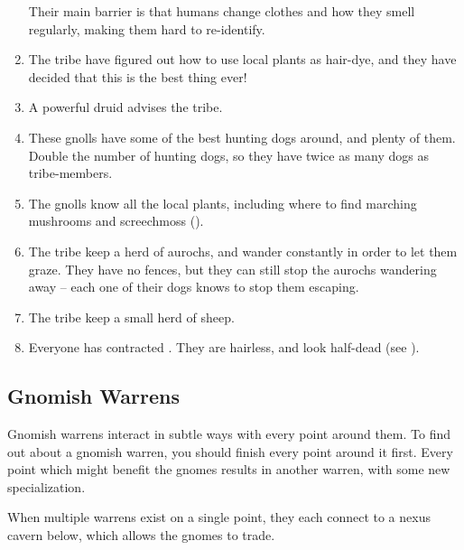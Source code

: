 \begin{multicols}{2}
\begin{enumerate}
  Their main barrier is that humans change clothes and how they smell regularly, making them hard to re-identify.
  \item
  The tribe have figured out how to use local plants as hair-dye, and they have decided that this is the best thing ever!
  \item
  A powerful druid advises the tribe.
  \item
  These gnolls have some of the best hunting dogs around, and plenty of them.
  Double the number of hunting dogs, so they have twice as many dogs as tribe-members.
  \item
  The gnolls know all the local plants, including where to find marching mushrooms and screechmoss ().
  \item
  The tribe keep a herd of aurochs, and wander constantly in order to let them graze.
  They have no fences, but they can still stop the aurochs wandering away -- each one of their dogs knows to stop them escaping.
  \item
  The tribe keep a small herd of sheep.
  \item
  Everyone has contracted .
  They are hairless, and look half-dead
  (see ).
\end{enumerate}

\subsection{Gnomish Warrens}

Gnomish warrens interact in subtle ways with every point around them.
To find out about a gnomish warren, you should finish every point around it first.
Every point which might benefit the gnomes results in another warren, with some new specialization.

When multiple warrens exist on a single point, they each connect to a nexus cavern below, which allows the gnomes to trade.


\end{multicols}
